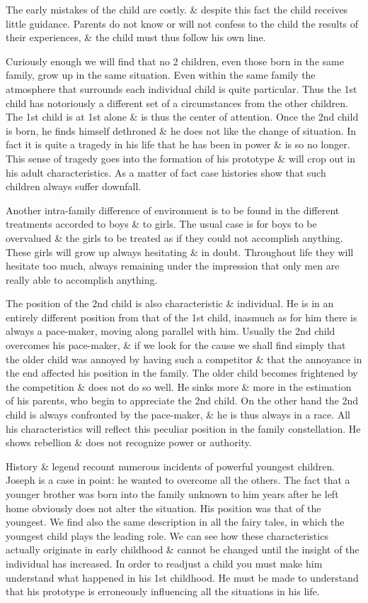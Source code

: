 \documentclass{article}
\numberwithin{equation}{section}
\begin{document}
The early mistakes of the child are costly. \& despite this fact the child receives little guidance. Parents do not know or will not confess to the child the results of their experiences, \& the child must thus follow his own line.

Curiously enough we will find that no 2 children, even those born in the same family, grow up in the same situation. Even within the same family the atmosphere that surrounds each individual child is quite particular. Thus the 1st child has notoriously a different set of a circumstances from the other children. The 1st child is at 1st alone \& is thus the center of attention. Once the 2nd child is born, he finds himself dethroned \& he does not like the change of situation. In fact it is quite a tragedy in his life that he has been in power \& is so no longer. This sense of tragedy goes into the formation of his prototype \& will crop out in his adult characteristics. As a matter of fact case histories show that such children always suffer downfall.

Another intra-family difference of environment is to be found in the different treatments accorded to boys \& to girls. The usual case is for boys to be overvalued \& the girls to be treated as if they could not accomplish anything. These girls will grow up always hesitating \& in doubt. Throughout life they will hesitate too much, always remaining under the impression that only men are really able to accomplish anything.

The position of the 2nd child is also characteristic \& individual. He is in an entirely different position from that of the 1st child, inasmuch as for him there is always a pace-maker, moving along parallel with him. Usually the 2nd child overcomes his pace-maker, \& if we look for the cause we shall find simply that the older child was annoyed by having such a competitor \& that the annoyance in the end affected his position in the family. The older child becomes frightened by the competition \& does not do so well. He sinks more \& more in the estimation of his parents, who begin to appreciate the 2nd child. On the other hand the 2nd child is always confronted by the pace-maker, \& he is thus always in a race. All his characteristics will reflect this peculiar position in the family constellation. He shows rebellion \& does not recognize power or authority.

History \& legend recount numerous incidents of powerful youngest children. Joseph is a case in point: he wanted to overcome all the others. The fact that a younger brother was born into the family unknown to him years after he left home obviously does not alter the situation. His position was that of the youngest. We find also the same description in all the fairy tales, in which the youngest child plays the leading role. We can see how these characteristics actually originate in early childhood \& cannot be changed until the insight of the individual has increased. In order to readjust a child you must make him understand what happened in his 1st childhood. He must be made to understand that his prototype is erroneously influencing all the situations in his life.
\end{document}
